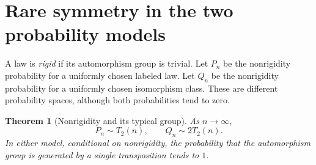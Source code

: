 \documentclass[11pt,letterpaper]{article}
\numberwithin{equation}{section}
\newtheorem{theorem}{Theorem}[section]
\theoremstyle{definition}\newtheorem{definition}[theorem]{Definition}
\theoremstyle{remark}\newtheorem{remark}[theorem]{Remark}
\begin{document}
\section{Rare symmetry in the two probability models}\label{cmg:sec:probability}
A law is \emph{rigid} if its automorphism group is trivial. Let $P_n$ be the nonrigidity probability for a uniformly chosen labeled law. Let $Q_n$ be the nonrigidity probability for a uniformly chosen isomorphism class. These are different probability spaces, although both probabilities tend to zero.

\begin{theorem}[Nonrigidity and its typical group]\label{cmg:thm:prob}
As $n\to\infty$,
\begin{equation}\label{cmg:eq:PQ}
 P_n\sim T_2(n),\qquad Q_n\sim2T_2(n).
\end{equation}
In either model, conditional on nonrigidity, the probability that the automorphism group is generated by a single transposition tends to $1$.
\end{theorem}
\end{document}
